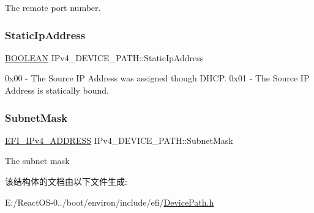 The remote port number. \mbox{\label{struct_i_pv4___d_e_v_i_c_e___p_a_t_h_a8948f5aa5deccf2315d71cd0b4d85e9d}} 
\subsubsection{\texorpdfstring{Static\+Ip\+Address}{StaticIpAddress}}
{\footnotesize\ttfamily \hyperlink{_processor_bind_8h_a112e3146cb38b6ee95e64d85842e380a}{B\+O\+O\+L\+E\+AN} I\+Pv4\+\_\+\+D\+E\+V\+I\+C\+E\+\_\+\+P\+A\+T\+H\+::\+Static\+Ip\+Address}

0x00 -\/ The Source IP Address was assigned though D\+H\+CP. 0x01 -\/ The Source IP Address is statically bound. \mbox{\label{struct_i_pv4___d_e_v_i_c_e___p_a_t_h_a71cc05843ec9031962b802ef65534d7d}} 
\subsubsection{\texorpdfstring{Subnet\+Mask}{SubnetMask}}
{\footnotesize\ttfamily \hyperlink{struct_e_f_i___i_pv4___a_d_d_r_e_s_s}{E\+F\+I\+\_\+\+I\+Pv4\+\_\+\+A\+D\+D\+R\+E\+SS} I\+Pv4\+\_\+\+D\+E\+V\+I\+C\+E\+\_\+\+P\+A\+T\+H\+::\+Subnet\+Mask}

The subnet mask 

该结构体的文档由以下文件生成\+:\begin{DoxyCompactItemize}
\item 
E\+:/\+React\+O\+S-\/0../boot/environ/include/efi/\hyperlink{_device_path_8h}{Device\+Path.\+h}\end{DoxyCompactItemize}

